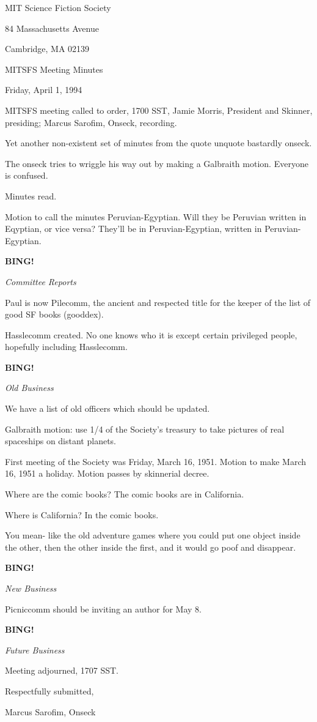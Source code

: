 \documentclass[12pt]{article}
\newcommand{\bing}{{\bf BING!} }
\newcommand{\goto}[1]{\bing \vskip 12pt \centerline{{\em{#1}}}}
\begin{document}
\begin{center}

MIT Science Fiction Society 

84 Massachusetts Avenue

Cambridge, MA 02139

\vspace{12pt}

MITSFS Meeting Minutes 

Friday, April 1, 1994

\end{center}
 
\vspace{18pt}

\setlength{\parskip}{6pt}

\noindent
MITSFS meeting called to order, 1700 SST,
Jamie Morris, President and Skinner, presiding; Marcus Sarofim, Onseck, recording.

Yet another non-existent set of minutes from the quote unquote bastardly onseck.

The onseck tries to wriggle his way out by making a Galbraith motion. Everyone is confused.

Minutes read.

Motion to call the minutes Peruvian-Egyptian. Will they be Peruvian written in Eqyptian, or vice versa? They'll be in Peruvian-Egyptian, written in Peruvian-Egyptian.

\goto{Committee Reports}

Paul is now Pilecomm, the ancient and respected title for the keeper of the list of good SF books (gooddex).

Hasslecomm created. No one knows who it is except certain privileged people, hopefully including Hasslecomm.

\goto{Old Business}

We have a list of old officers which should be updated.

Galbraith motion: use 1/4 of the Society's treasury to take pictures of real spaceships on distant planets.

First meeting of the Society was Friday, March 16, 1951. Motion to make March 16, 1951 a holiday. Motion passes by skinnerial decree.

Where are the comic books? The comic books are in California.

Where is California? In the comic books.

You mean- like the old adventure games where you could put one object inside the other, then the other inside the first, and it would go poof and disappear.

\goto{New Business}

Picniccomm should be inviting an author for May 8.

\goto{Future Business}

\vspace{12pt}

\noindent
Meeting adjourned, 1707 SST.

\vspace{18pt}

\centerline{Respectfully submitted,}
\centerline{Marcus Sarofim, Onseck}
\end{document}
